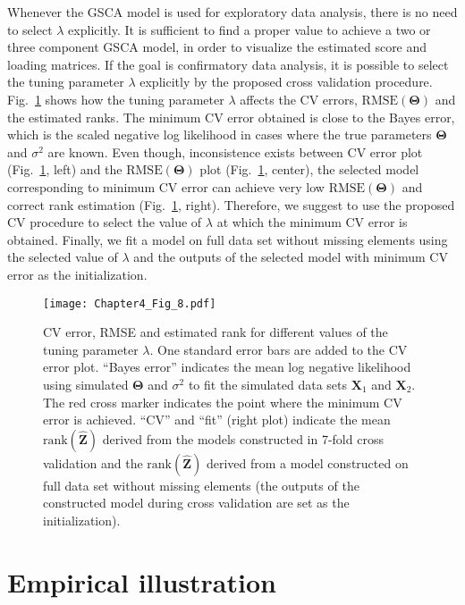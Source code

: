 Whenever the GSCA model is used for exploratory data analysis, there is no need to select $\lambda$ explicitly. It is sufficient to find a proper value to achieve a two or three component GSCA model, in order to visualize the estimated score and loading matrices. If the goal is confirmatory data analysis, it is possible to select the tuning parameter $\lambda$ explicitly by the proposed cross validation procedure. Fig.~\ref{chapter4_fig:8} shows how the tuning parameter $\lambda$ affects the CV errors, $\text{RMSE}(\mathbf{\Theta})$ and the estimated ranks. The minimum CV error obtained is close to the Bayes error, which is the scaled negative log likelihood in cases where the true parameters $\mathbf{\Theta}$ and $\sigma^2$ are known. Even though, inconsistence exists between CV error plot (Fig.~\ref{chapter4_fig:8}, left) and the $\text{RMSE}(\mathbf{\Theta})$ plot (Fig.~\ref{chapter4_fig:8}, center), the selected model corresponding to minimum CV error can achieve very low $\text{RMSE}(\mathbf{\Theta})$ and correct rank estimation (Fig.~\ref{chapter4_fig:8}, right). Therefore, we suggest to use the proposed CV procedure to select the value of $\lambda$ at which the minimum CV error is obtained. Finally, we fit a model on full data set without missing elements using the selected value of $\lambda$ and the outputs of the selected model with minimum CV error as the initialization.
\begin{figure}[htbp]
    \centering
    \texttt{[image: Chapter4\_Fig\_8.pdf]}
    \caption{CV error, RMSE and estimated rank for different values of the tuning parameter $\lambda$. One standard error bars are added to the CV error plot. ``Bayes error'' indicates the mean log negative likelihood using simulated $\mathbf{\Theta}$ and $\sigma^2$ to fit the simulated data sets $\mathbf{X}_1$ and $\mathbf{X}_2$. The red cross marker indicates the point where the minimum CV error is achieved. ``CV'' and ``fit'' (right plot) indicate the mean $\text{rank}(\hat{\mathbf{Z}})$ derived from the models constructed in 7-fold cross validation and the $\text{rank}(\hat{\mathbf{Z}})$ derived from a model constructed on full data set without missing elements (the outputs of the constructed model during cross validation are set as the initialization).}
    \label{chapter4_fig:8}
\end{figure}

\section{Empirical illustration}  \label{section:4.5}
